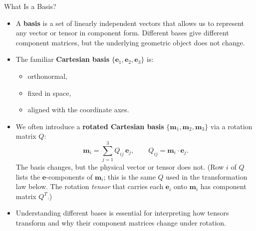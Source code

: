 \documentclass[aspectratio=169,11pt]{beamer}
\begin{document}
\begin{frame}{What Is a Basis?}

\begin{itemize}

    \item A \textbf{basis} is a set of linearly independent vectors that allows us
          to represent any vector or tensor in component form.
          Different bases give different component matrices, but the
          underlying geometric object does not change.

    \item The familiar \textbf{Cartesian basis}
          $\{\mathbf{e}_1,\mathbf{e}_2,\mathbf{e}_3\}$ is:
          \begin{itemize}
              \item orthonormal,
              \item fixed in space,
              \item aligned with the coordinate axes.
          \end{itemize}

    \item We often introduce a \textbf{rotated Cartesian basis}
          $\{\mathbf{m}_1,\mathbf{m}_2,\mathbf{m}_3\}$ via a rotation matrix $Q$:
          \[
              \mathbf{m}_i = \sum_{j=1}^{3} Q_{ij}\,\mathbf{e}_j, \qquad Q_{ij} = \mathbf{m}_i\cdot\mathbf{e}_j .
          \]
          The basis changes, but the physical vector or tensor does not.
          (Row $i$ of $Q$ lists the $\mathbf{e}$-components of $\mathbf{m}_i$; this is the same $Q$ used in the transformation law below. The rotation \emph{tensor} that carries each $\mathbf{e}_i$ onto $\mathbf{m}_i$ has component matrix $Q^T$.)

    \item Understanding different bases is essential for interpreting how tensors
          transform and why their component matrices change under rotation.

\end{itemize}

\end{frame}
\end{document}
